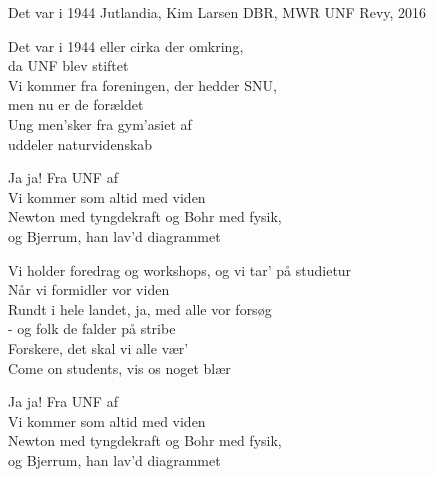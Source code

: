 \begin{song}{Det var i 1944}
  {} %
  {Jutlandia, Kim Larsen} %
  {DBR, MWR} %
  {UNF Revy, 2016} %
  {\NotCCLIed} %

  \begin{SBVerse}
    Det var i 1944 eller cirka der omkring,\\
    da UNF blev stiftet\\
    Vi kommer fra foreningen, der hedder SNU,\\
    men nu er de forældet\\
    Ung men’sker fra gym’asiet af\\
    uddeler naturvidenskab
  \end{SBVerse}

  \begin{SBChorus}
    Ja ja! Fra UNF af\\
    Vi kommer som altid med viden\\
    Newton med tyngdekraft og Bohr med fysik,\\
    og Bjerrum, han lav’d diagrammet
  \end{SBChorus}

  \begin{SBVerse}
    Vi holder foredrag og workshops, og vi tar’ på studietur\\
    Når vi formidler vor viden\\
    Rundt i hele landet, ja, med alle vor forsøg\\
    - og folk de falder på stribe\\
    Forskere, det skal vi alle vær’\\
    Come on students, vis os noget blær
  \end{SBVerse}

  \begin{SBChorus}
    Ja ja! Fra UNF af\\
    Vi kommer som altid med viden\\
    Newton med tyngdekraft og Bohr med fysik,\\
    og Bjerrum, han lav’d diagrammet
  \end{SBChorus}



\end{song}

